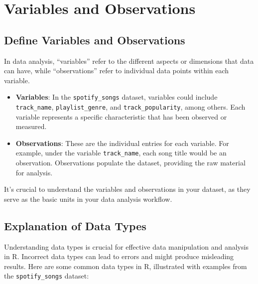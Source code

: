 \documentclass[
]{book}
\begin{document}
\section{Variables and Observations}\label{variables-and-observations}

\subsection*{Define Variables and Observations}\label{define-variables-and-observations}

In data analysis, ``variables'' refer to the different aspects or dimensions that data can have, while ``observations'' refer to individual data points within each variable.

\begin{itemize}
\item
  \textbf{Variables}: In the \texttt{spotify\_songs} dataset, variables could include \texttt{track\_name}, \texttt{playlist\_genre}, and \texttt{track\_popularity}, among others. Each variable represents a specific characteristic that has been observed or measured.
\item
  \textbf{Observations}: These are the individual entries for each variable. For example, under the variable \texttt{track\_name}, each song title would be an observation. Observations populate the dataset, providing the raw material for analysis.
\end{itemize}

It's crucial to understand the variables and observations in your dataset, as they serve as the basic units in your data analysis workflow.

\subsection*{Explanation of Data Types}\label{explanation-of-data-types}

Understanding data types is crucial for effective data manipulation and analysis in R. Incorrect data types can lead to errors and might produce misleading results. Here are some common data types in R, illustrated with examples from the \texttt{spotify\_songs} dataset:
\end{document}
